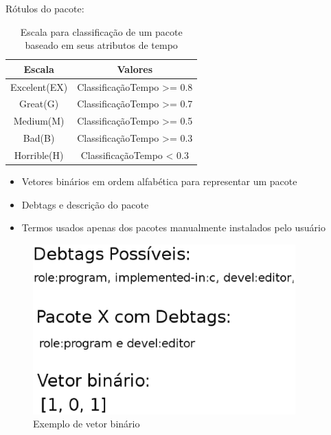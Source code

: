 \begin{frame}

    Rótulos do pacote:
    \newline
    \newline

    \begin{table}[h]
    \centering
    \begin{tabular}{cc}
    \hline
    \rowcolor[HTML]{EFEFEF}
    {Escala} & {Valores} \\ \hline
    {Excelent(EX)}  & ClassificaçãoTempo >= 0.8                  \\ \hline
    {Great(G)}   & ClassificaçãoTempo >= 0.7                  \\ \hline
    {Medium(M)}   & ClassificaçãoTempo >= 0.5                  \\ \hline
    {Bad(B)}   & ClassificaçãoTempo >= 0.3                  \\ \hline
    {Horrible(H)}   &ClassificaçãoTempo < 0.3                   \\ \hline
    \end{tabular}
    \caption{Escala para classificação de um pacote baseado em seus atributos de tempo}
    \label{tab:classificacao_pacotes}
    \end{table}

\end{frame}

\begin{frame}

    \begin{itemize}
        \item Vetores binários em ordem alfabética para representar um pacote
        \item Debtags e descrição do pacote
        \item Termos usados apenas dos pacotes manualmente instalados pelo
              usuário
    \end{itemize}
\end{frame}

\begin{frame}
 \begin{figure}[h]
  \centering
  \includegraphics[width=0.9\textwidth]{figura/vetor_binario.eps}
  \caption{Exemplo de vetor binário}
  \label{fig:curva_aprendizado}
 \end{figure}
\end{frame}

